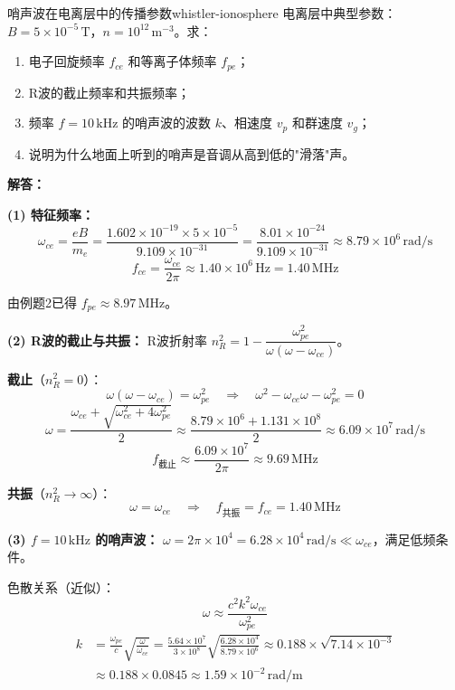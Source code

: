 \begin{example}{哨声波在电离层中的传播参数}{whistler-ionosphere}
电离层中典型参数：$B=5\times 10^{-5}\,\mathrm{T}$，$n=10^{12}\,\mathrm{m}^{-3}$。求：
\begin{enumerate}[label=(\arabic*)]
\item 电子回旋频率 $f_{ce}$ 和等离子体频率 $f_{pe}$；
\item R波的截止频率和共振频率；
\item 频率 $f=10\,\mathrm{kHz}$ 的哨声波的波数 $k$、相速度 $v_p$ 和群速度 $v_g$；
\item 说明为什么地面上听到的哨声是音调从高到低的"滑落"声。
\end{enumerate}
\tcblower
\textbf{解答：}

\textbf{(1) 特征频率：}
\[
\omega_{ce} = \frac{eB}{m_e} = \frac{1.602\times 10^{-19}\times 5\times 10^{-5}}{9.109\times 10^{-31}} = \frac{8.01\times 10^{-24}}{9.109\times 10^{-31}} \approx 8.79\times 10^6\,\mathrm{rad/s}
\]
\[
f_{ce} = \frac{\omega_{ce}}{2\pi} \approx 1.40\times 10^6\,\mathrm{Hz} = 1.40\,\mathrm{MHz}
\]

由例题2已得 $f_{pe} \approx 8.97\,\mathrm{MHz}$。

\textbf{(2) R波的截止与共振：}
R波折射率 $n_R^2 = 1 - \dfrac{\omega_{pe}^2}{\omega(\omega - \omega_{ce})}$。

\textbf{截止}（$n_R^2 = 0$）：
\[
\omega(\omega - \omega_{ce}) = \omega_{pe}^2 \quad\Rightarrow\quad \omega^2 - \omega_{ce}\omega - \omega_{pe}^2 = 0
\]
\[
\omega = \frac{\omega_{ce} + \sqrt{\omega_{ce}^2 + 4\omega_{pe}^2}}{2} \approx \frac{8.79\times 10^6 + 1.131\times 10^8}{2} \approx 6.09\times 10^7\,\mathrm{rad/s}
\]
\[
f_{\text{截止}} \approx \frac{6.09\times 10^7}{2\pi} \approx 9.69\,\mathrm{MHz}
\]

\textbf{共振}（$n_R^2 \to \infty$）：
\[
\omega = \omega_{ce} \quad\Rightarrow\quad f_{\text{共振}} = f_{ce} = 1.40\,\mathrm{MHz}
\]

\textbf{(3) $f=10\,\mathrm{kHz}$ 的哨声波：}
$\omega = 2\pi\times 10^4 = 6.28\times 10^4\,\mathrm{rad/s} \ll \omega_{ce}$，满足低频条件。

色散关系（近似）：
\[
\omega \approx \frac{c^2 k^2 \omega_{ce}}{\omega_{pe}^2}
\]
\[
\begin{aligned}
k &= \frac{\omega_{pe}}{c}\sqrt{\frac{\omega}{\omega_{ce}}} = \frac{5.64\times 10^7}{3\times 10^8}\sqrt{\frac{6.28\times 10^4}{8.79\times 10^6}} \approx 0.188\times\sqrt{7.14\times 10^{-3}}\\
&\approx 0.188\times 0.0845 \approx 1.59\times 10^{-2}\,\mathrm{rad/m}
\end{aligned}
\]


\end{example}
